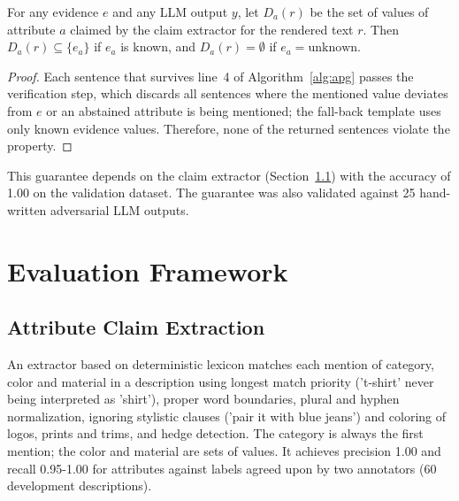 \documentclass[runningheads]{llncs}
\begin{document}
\begin{proposition}
For any evidence $e$ and any LLM output $y$, let $D_a(r)$ be the set of values of attribute $a$ claimed by the claim extractor for the rendered text $r$. Then $D_a(r)\subseteq\{e_a\}$ if $e_a$ is known, and $D_a(r)=\emptyset$ if $e_a=\mathrm{unknown}$.
\end{proposition}
\begin{proof}
Each sentence that survives line~4 of Algorithm~\ref{alg:apg} passes the verification step, which discards all sentences where the mentioned value deviates from $e$ or an abstained attribute is being mentioned; the fall-back template uses only known evidence values. Therefore, none of the returned sentences violate the property.
\end{proof}
This guarantee depends on the claim extractor (Section~\ref{sec:claims}) with the accuracy of 1.00 on the validation dataset. The guarantee was also validated against 25 hand-written adversarial LLM outputs.

\section{Evaluation Framework}\label{sec:eval}
\subsection{Attribute Claim Extraction}\label{sec:claims}
An extractor based on deterministic lexicon matches each mention of category, color and material in a description using longest match priority ('t-shirt' never being interpreted as 'shirt'), proper word boundaries, plural and hyphen normalization, ignoring stylistic clauses ('pair it with blue jeans') and coloring of logos, prints and trims, and hedge detection. The category is always the first mention; the color and material are sets of values. It achieves precision 1.00 and recall 0.95-1.00 for attributes against labels agreed upon by two annotators (60 development descriptions).
\end{document}
